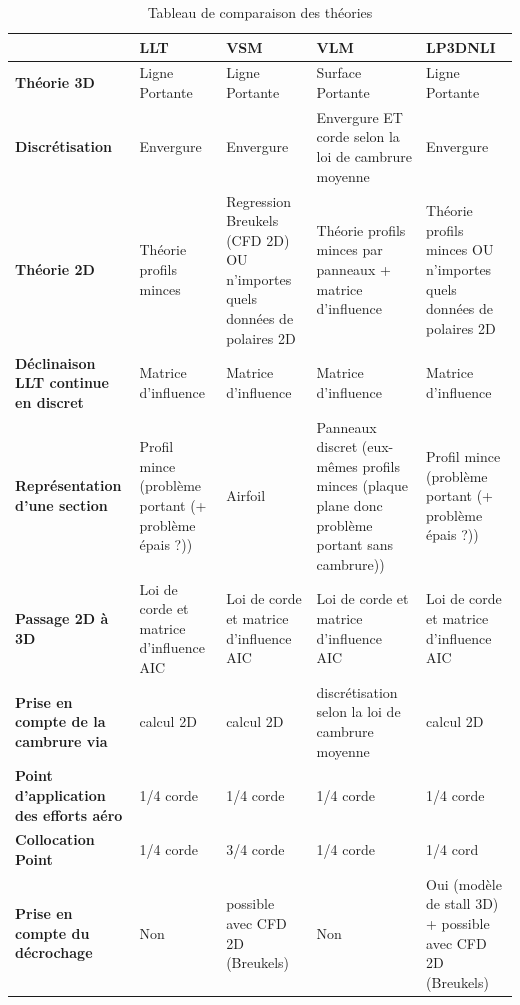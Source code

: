 \begin{table}[h!]
    \centering
    \begin{tabular}{|p{2.8cm}|p{1.6cm}|p{2cm}|p{3cm}|p{2cm}|}
        \hline
        & \textbf{LLT} & \textbf{VSM} & \textbf{VLM} & \textbf{LP3DNLI} \\ \hline
        \textbf{Théorie 3D} & Ligne Portante & Ligne Portante & Surface Portante & Ligne Portante\\ \hline
        \textbf{Discrétisation} & Envergure & Envergure & Envergure ET corde selon la loi de cambrure moyenne & Envergure \\ \hline
        \textbf{Théorie 2D} & Théorie profils minces & Regression Breukels (CFD 2D) OU n'importes quels données de polaires 2D & Théorie profils minces par panneaux + matrice d'influence & Théorie profils minces OU n'importes quels données de polaires 2D \\ \hline
        \textbf{Déclinaison LLT continue en discret} & Matrice d'influence & Matrice d'influence & Matrice d'influence & Matrice d'influence\\ \hline
        \textbf{Représentation d'une section} & Profil mince (problème portant (+ problème épais ?)) & Airfoil & Panneaux discret (eux-mêmes profils minces (plaque plane donc problème portant sans cambrure)) & Profil mince (problème portant (+ problème épais ?)) \\ \hline
        \textbf{Passage 2D à 3D} & Loi de corde et matrice d'influence AIC & Loi de corde et matrice d'influence AIC & Loi de corde et matrice d'influence AIC & Loi de corde et matrice d'influence AIC\\ \hline
        \textbf{Prise en compte de la cambrure via} & calcul 2D & calcul 2D & discrétisation selon la loi de cambrure moyenne & calcul 2D\\ \hline
        \textbf{Point d'application des efforts aéro} & 1/4 corde & 1/4 corde & 1/4 corde & 1/4 corde\\ \hline
        \textbf{Collocation Point} & 1/4 corde & 3/4 corde & 1/4 corde & 1/4 cord \\ \hline
        \textbf{Prise en compte du décrochage} & Non & possible avec CFD 2D (Breukels) & Non & Oui (modèle de stall 3D) + possible avec CFD 2D (Breukels) \\ \hline
    \end{tabular}
    \caption{Tableau de comparaison des théories}
    \label{tab:comparaison}
\end{table}